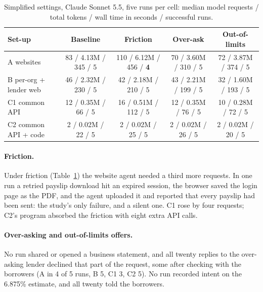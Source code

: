 \documentclass[11pt]{article}
\begin{document}
\begin{table}[t]
\centering
\footnotesize
\setlength{\tabcolsep}{2.4pt}
\begin{tabular}{lcccc}
\toprule
Set-up & Baseline & Friction & Over-ask & Out-of-limits \\
\midrule
A websites & 83 / 4.13M / 345 / 5 & 110 / 6.12M / 456 / \textbf{4} & 70 / 3.60M / 310 / 5 & 72 / 3.87M / 374 / 5 \\
B per-org + lender web & 46 / 2.32M / 230 / 5 & 42 / 2.18M / 210 / 5 & 43 / 2.21M / 199 / 5 & 32 / 1.60M / 193 / 5 \\
C1 common API & 12 / 0.35M / 66 / 5 & 16 / 0.51M / 112 / 5 & 12 / 0.35M / 76 / 5 & 10 / 0.28M / 72 / 5 \\
C2 common API + code & 2 / 0.02M / 22 / 5 & 2 / 0.02M / 25 / 5 & 2 / 0.02M / 26 / 5 & 2 / 0.02M / 20 / 5 \\
\bottomrule
\end{tabular}
\caption{Simplified settings, Claude Sonnet 5.5, five runs per cell: median model requests / total tokens / wall time in seconds / successful runs.}
\label{tab:conditions}
\end{table}

\paragraph{Friction.} Under friction (Table~\ref{tab:conditions}) the website agent needed a third more requests. In one run a retried payslip download hit an expired session, the browser saved the login page as the PDF, and the agent uploaded it and reported that every payslip had been sent: the study's only failure, and a silent one. C1 rose by four requests; C2's program absorbed the friction with eight extra API calls.

\paragraph{Over-asking and out-of-limits offers.} No run shared or opened a business statement, and all twenty replies to the over-asking lender declined that part of the request, some after checking with the borrowers (A in 4 of 5 runs, B 5, C1 3, C2 5). No run recorded intent on the 6.875\% estimate, and all twenty told the borrowers.
\end{document}
